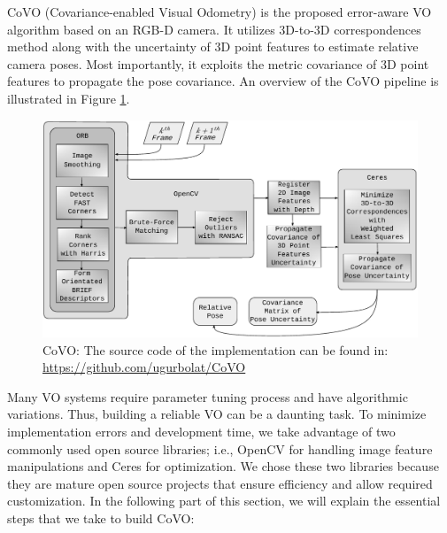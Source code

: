 \documentclass[12pt]{report}
\numberwithin{figure}{section}
\begin{document}
CoVO (Covariance-enabled Visual Odometry) is the proposed error-aware VO
algorithm based on an RGB-D camera.  It utilizes 3D-to-3D correspondences
method along with the uncertainty of 3D point features to estimate relative
camera poses. Most importantly, it exploits the metric covariance of 3D point
features to propagate the pose covariance.  An overview of the CoVO pipeline is
illustrated in Figure \ref{fig:covo_pipeline}.

\begin{figure}[H] \centering
\includegraphics[width=0.9\linewidth,natwidth=640,natheight=640]
{fig/drawings/covo.pdf} \caption[CoVO Pipeline]{CoVO: The source code of the
implementation can be found in:
\href{https://github.com/ugurbolat/CoVO}{https://github.com/ugurbolat/CoVO}}
\label{fig:covo_pipeline} \end{figure}

Many VO systems require parameter tuning process and have algorithmic
variations.  Thus, building a reliable VO can be a daunting task.  To minimize
implementation errors and development time, we take advantage of two commonly
used open source libraries; i.e., OpenCV \parencite{opencv} for handling 
image
feature manipulations and Ceres \parencite{ceres-solver} for optimization. We
chose these two libraries because they are mature open source projects that
ensure efficiency and allow required customization.  In the following part of
this section, we will explain the essential steps that we take to build CoVO:
\end{document}
